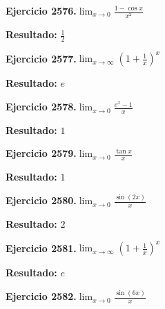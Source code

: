 \documentclass[10pt,a4paper]{article}
\begin{document}
\begin{ejbox}
\textbf{Ejercicio 2576.}\quad $\lim_{x\to 0} \frac{1-\cos x}{x^2}$
\end{ejbox}

\begin{solbox}
\textbf{Resultado:} \(\displaystyle \frac{1}{2}\)
\end{solbox}

\newpage
\begin{ejbox}
\textbf{Ejercicio 2577.}\quad $\lim_{x\to \infty} \left(1+\frac{1}{x}\right)^x$
\end{ejbox}

\begin{solbox}
\textbf{Resultado:} \(\displaystyle e\)
\end{solbox}

\begin{ejbox}
\textbf{Ejercicio 2578.}\quad $\lim_{x\to 0} \frac{e^x-1}{x}$
\end{ejbox}

\begin{solbox}
\textbf{Resultado:} \(\displaystyle 1\)
\end{solbox}

\begin{ejbox}
\textbf{Ejercicio 2579.}\quad $\lim_{x\to 0} \frac{\tan x}{x}$
\end{ejbox}

\begin{solbox}
\textbf{Resultado:} \(\displaystyle 1\)
\end{solbox}

\newpage
\begin{ejbox}
\textbf{Ejercicio 2580.}\quad $\lim_{x\to 0} \frac{\sin(2x)}{x}$
\end{ejbox}

\begin{solbox}
\textbf{Resultado:} \(\displaystyle 2\)
\end{solbox}

\begin{ejbox}
\textbf{Ejercicio 2581.}\quad $\lim_{x\to \infty} \left(1+\frac{1}{x}\right)^x$
\end{ejbox}

\begin{solbox}
\textbf{Resultado:} \(\displaystyle e\)
\end{solbox}

\begin{ejbox}
\textbf{Ejercicio 2582.}\quad $\lim_{x\to 0} \frac{\sin(6x)}{x}$
\end{ejbox}
\end{document}
